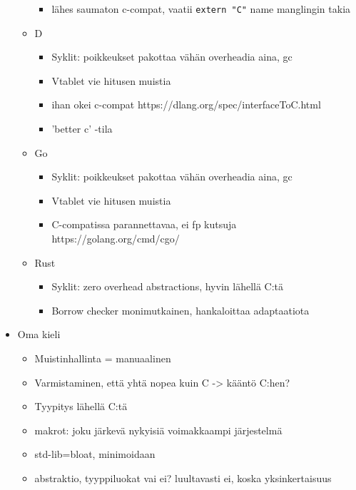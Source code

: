 \begin{itemize}
\begin{itemize}
\begin{itemize}
                    \item lähes saumaton c-compat, vaatii \texttt{extern "C"} name manglingin takia
                \end{itemize}
            \item D
                \begin{itemize}
                    \item Syklit: poikkeukset pakottaa vähän overheadia aina, gc
                    \item Vtablet vie hitusen muistia
                    \item ihan okei c-compat https://dlang.org/spec/interfaceToC.html
                    \item 'better c' -tila
                \end{itemize}
            \item Go
                \begin{itemize}
                    \item Syklit: poikkeukset pakottaa vähän overheadia aina, gc
                    \item Vtablet vie hitusen muistia
                    \item C-compatissa parannettavaa, ei fp kutsuja https://golang.org/cmd/cgo/
                \end{itemize}
            \item Rust
                \begin{itemize}
                    \item Syklit: zero overhead abstractions, hyvin lähellä C:tä
                    \item Borrow checker monimutkainen, hankaloittaa adaptaatiota
                \end{itemize}
        \end{itemize}
    \item Oma kieli
        \begin{itemize}
            \item Muistinhallinta = manuaalinen
            \item Varmistaminen, että yhtä nopea kuin C -> kääntö C:hen?
            \item Tyypitys lähellä C:tä
            \item makrot: joku järkevä nykyisiä voimakkaampi järjestelmä
            \item std-lib=bloat, minimoidaan
            \item abstraktio, tyyppiluokat vai ei? luultavasti ei, koska yksinkertaisuus

\end{itemize}
\end{itemize}
